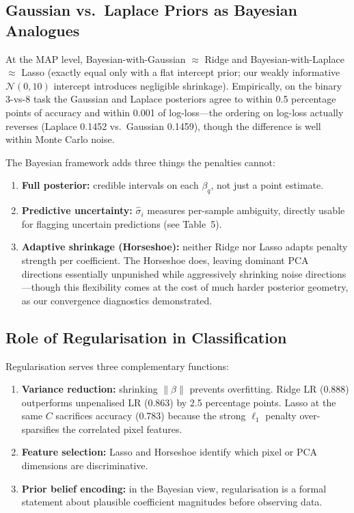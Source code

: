 \documentclass[10pt, letterpaper]{article}
\begin{document}
\subsection{Gaussian vs.\ Laplace Priors as Bayesian Analogues}
At the MAP level, Bayesian-with-Gaussian $\approx$ Ridge and Bayesian-with-Laplace $\approx$ Lasso (exactly equal only with a flat intercept prior; our weakly informative $\mathcal{N}(0, 10)$ intercept introduces negligible shrinkage). Empirically, on the binary 3-vs-8 task the Gaussian and Laplace posteriors agree to within 0.5 percentage points of accuracy and within 0.001 of log-loss---the ordering on log-loss actually reverses (Laplace 0.1452 vs.\ Gaussian 0.1459), though the difference is well within Monte Carlo noise.

The Bayesian framework adds three things the penalties cannot:
\begin{enumerate}
\item \textbf{Full posterior:} credible intervals on each $\beta_q$, not just a point estimate.
\item \textbf{Predictive uncertainty:} $\hat{\sigma}_i$ measures per-sample ambiguity, directly usable for flagging uncertain predictions (see Table~5).
\item \textbf{Adaptive shrinkage (Horseshoe):} neither Ridge nor Lasso adapts penalty strength per coefficient. The Horseshoe does, leaving dominant PCA directions essentially unpunished while aggressively shrinking noise directions---though this flexibility comes at the cost of much harder posterior geometry, as our convergence diagnostics demonstrated.
\end{enumerate}

\subsection{Role of Regularisation in Classification}
Regularisation serves three complementary functions:
\begin{enumerate}
\item \textbf{Variance reduction:} shrinking $\|\beta\|$ prevents overfitting. Ridge LR (0.888) outperforms unpenalised LR (0.863) by 2.5 percentage points. Lasso at the same $C$ sacrifices accuracy (0.783) because the strong $\ell_1$ penalty over-sparsifies the correlated pixel features.
\item \textbf{Feature selection:} Lasso and Horseshoe identify which pixel or PCA dimensions are discriminative.
\item \textbf{Prior belief encoding:} in the Bayesian view, regularisation is a formal statement about plausible coefficient magnitudes before observing data.
\end{enumerate}
\end{document}
